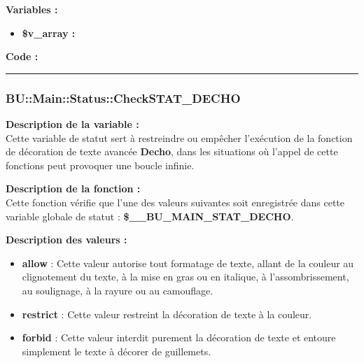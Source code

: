 \documentclass[a4paper,10pt]{article}
\begin{document}
\begin{justify}
    \textbf{Variables :}

    \begin{itemize}
        \item \textbf{\color{orange}\$v\_array\color{white} :} \\
    \end{itemize}
\end{justify}

\textbf{Code :}



\color{blue}\par\noindent\rule{\textwidth}{0.4pt}\color{white}

\color{blue}
\subsubsection{\color{mauve}BU::Main::Status::CheckSTAT\_DECHO}\color{white}

\begin{justify}
    \textbf{Description de la variable :}\\
    Cette variable de statut sert à restreindre ou empêcher l'exécution de la fonction de décoration de texte avancée \textbf{\color{mauve}Decho}, dans les situations où l'appel de cette fonctions peut provoquer une boucle infinie.
\end{justify}

\begin{justify}
    \textbf{Description de la fonction :}\\
    Cette fonction vérifie que l'une des valeurs suivantes soit enregistrée dans cette variable globale de statut : \textbf{\color{orange}\$\_\_BU\_MAIN\_STAT\_DECHO}.
\end{justify}

\begin{justify}
    \textbf{Description des valeurs :}

    \begin{itemize}
        \item \textbf{allow} : Cette valeur autorise tout formatage de texte, allant de la couleur au clignotement du texte, à la mise en gras ou en italique, à l'assombrissement, au soulignage, à la rayure ou au camouflage.\\

        \item \textbf{restrict} : Cette valeur restreint la décoration de texte à la couleur.\\

        \item \textbf{forbid} : Cette valeur interdit purement la décoration de texte et entoure simplement le texte à décorer de guillemets.
    \end{itemize}

\end{justify}
\end{document}
